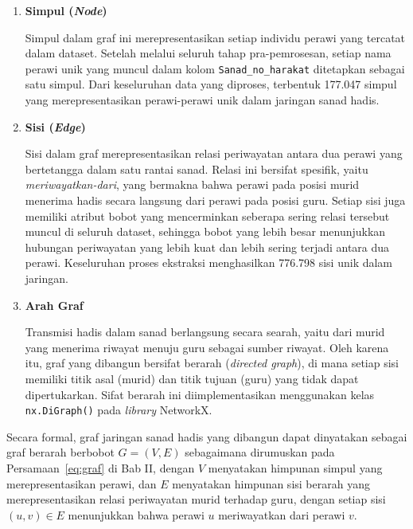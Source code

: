 \begin{enumerate}
	\item \textbf{Simpul (\textit{Node})}
	
	Simpul dalam graf ini merepresentasikan setiap individu perawi yang tercatat dalam dataset. Setelah melalui seluruh tahap pra-pemrosesan, setiap nama perawi unik yang muncul dalam kolom \texttt{Sanad\_no\_harakat} ditetapkan sebagai satu simpul. Dari keseluruhan data yang diproses, terbentuk 177.047 simpul yang merepresentasikan perawi-perawi unik dalam jaringan sanad hadis.

	\item \textbf{Sisi (\textit{Edge})}

	\begin{sloppypar}
	Sisi dalam graf merepresentasikan relasi periwayatan antara dua perawi yang bertetangga dalam satu rantai sanad. Relasi ini bersifat spesifik, yaitu \textit{meriwayatkan-dari}, yang bermakna bahwa perawi pada posisi murid menerima hadis secara langsung dari perawi pada posisi guru. Setiap sisi juga memiliki atribut bobot yang mencerminkan seberapa sering relasi tersebut muncul di seluruh dataset, sehingga bobot yang lebih besar menunjukkan hubungan periwayatan yang lebih kuat dan lebih sering terjadi antara dua perawi. Keseluruhan proses ekstraksi menghasilkan 776.798 sisi unik dalam jaringan.
	\end{sloppypar}

	\item \textbf{Arah Graf}
	
	Transmisi hadis dalam sanad berlangsung secara searah, yaitu dari murid yang menerima riwayat menuju guru sebagai sumber riwayat. Oleh karena itu, graf yang dibangun bersifat berarah (\textit{directed graph}), di mana setiap sisi memiliki titik asal (murid) dan titik tujuan (guru) yang tidak dapat dipertukarkan. Sifat berarah ini diimplementasikan menggunakan kelas \texttt{nx.DiGraph()} pada \textit{library} NetworkX.

\end{enumerate}

Secara formal, graf jaringan sanad hadis yang dibangun dapat dinyatakan sebagai graf berarah berbobot $G = (V, E)$ sebagaimana dirumuskan pada Persamaan~\eqref{eq:graf} di Bab II, dengan $V$ menyatakan himpunan simpul yang merepresentasikan perawi, dan $E$ menyatakan himpunan sisi berarah yang merepresentasikan relasi periwayatan murid terhadap guru, dengan setiap sisi $(u,v) \in E$ menunjukkan bahwa perawi $u$ meriwayatkan dari perawi $v$.


